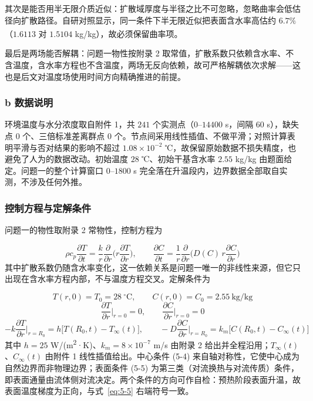 其次是能否用半无限介质近似：扩散域厚度与半径之比不可忽略，忽略曲率会低估径向扩散路径。自研对照显示，同一条件下半无限近似把表面含水率高估约 $6.7\%$（$1.6113$ 对 $1.5104$ kg/kg），故必须保留曲率项\textsuperscript{\cite{ref1}}。

最后是两场能否解耦：问题一物性按附录 2 取常值，扩散系数只依赖含水率、不含温度，含水率方程也不含温度，两场无反向依赖，故可严格解耦依次求解——这也是后文对温度场使用时间方向精确推进的前提。

\subsubsection{b 数据说明}
环境温度与水分浓度取自附件 1，共 $241$ 个实测点（$0$–$14400$ s，间隔 $60$ s），缺失点 $0$ 个、三倍标准差离群点 $0$ 个。节点间采用线性插值、不做平滑；对照计算表明平滑与否对结果的影响不超过 $1.08\times10^{-2}$ ℃，故保留原始数据不损失精度，也避免了人为的数据改动。初始温度 $28$ ℃、初始干基含水率 $2.55$ kg/kg 由题面给定。问题一的整个计算窗口 $0$–$1800$ s 完全落在升温段内，边界数据全部取自实测，不涉及任何外推。

\subsubsection{控制方程与定解条件}
问题一的物性取附录 2 常物性，控制方程为

\begin{equation}
  \rho c_p\frac{\partial T}{\partial t}=\frac{k}{r}\frac{\partial}{\partial r}\Big(r\frac{\partial T}{\partial r}\Big),\qquad \frac{\partial C}{\partial t}=\frac{1}{r}\frac{\partial}{\partial r}\Big(D(C)\,r\frac{\partial C}{\partial r}\Big)
  \label{eq:5-2}
\end{equation}
其中扩散系数仍随含水率变化，这一依赖关系是问题一唯一的非线性来源，但它只出现在含水率方程内部，不与温度方程交叉。定解条件为

\begin{equation}
  T(r,0)=T_0=28\ \mathrm{^\circ C},\qquad C(r,0)=C_0=2.55\ \mathrm{kg/kg}
  \label{eq:5-3}
\end{equation}
\begin{equation}
  \frac{\partial T}{\partial r}\Big|_{r=0}=0,\qquad \frac{\partial C}{\partial r}\Big|_{r=0}=0
  \label{eq:5-4}
\end{equation}
\begin{equation}
  -k\frac{\partial T}{\partial r}\Big|_{r=R_0}=h\big[T(R_0,t)-T_\infty(t)\big],\qquad -D\frac{\partial C}{\partial r}\Big|_{r=R_0}=k_m\big[C(R_0,t)-C_\infty(t)\big]
  \label{eq:5-5}
\end{equation}
其中 $h=25$ W/(m\textsuperscript{2}·K)、$k_m=8\times10^{-7}$ m/s 由附录 2 给出并全程沿用；$T_\infty(t)$、$C_\infty(t)$ 由附件 1 线性插值给出。中心条件 (5-4) 来自轴对称性，它使中心成为自然边界而非物理边界；表面条件 (5-5) 为第三类（对流换热与对流传质）条件，即表面通量由流体侧对流决定。两个条件的方向可作自检：预热阶段表面升温，故表面温度梯度为正向，与式~\eqref{eq:5-5} 右端符号一致。

